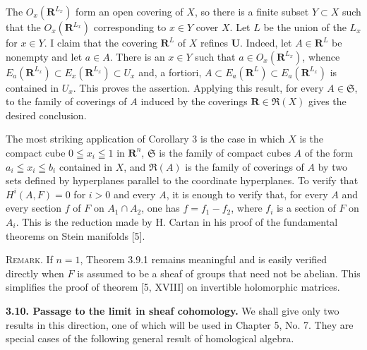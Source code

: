 
The $O_x(\mathbf R^{L_x})$ form an open covering of $X$, so there is a finite
subset $Y\subset X$ such that the $O_x(\mathbf R^{L_x})$ corresponding to
$x\in Y$ cover $X$. Let $L$ be the union of the $L_x$ for $x\in Y$. I claim
that the covering $\mathbf R^L$ of $X$ refines $\mathbf U$. Indeed, let
$A\in\mathbf R^L$ be nonempty and let $a\in A$. There is an $x\in Y$ such
that $a\in O_x(\mathbf R^{L_x})$, whence
$E_a(\mathbf R^{L_x})\subset E_x(\mathbf R^{L_x})\subset U_x$ and, a
fortiori,
$A\subset E_a(\mathbf R^L)\subset E_a(\mathbf R^{L_x})$ is contained in
$U_x$. This proves the assertion. Applying this result, for every
$A\in\mathfrak S$, to the family of coverings of $A$ induced by the coverings
$\mathbf R\in\mathfrak R(X)$ gives the desired conclusion.

The most striking application of Corollary 3 is the case in which $X$ is the
compact cube $0\leqq x_i\leqq1$ in $\mathbf R^n$, $\mathfrak S$ is the family
of compact cubes $A$ of the form $a_i\leqq x_i\leqq b_i$ contained in $X$,
and $\mathfrak R(A)$ is the family of coverings of $A$ by two sets defined by
hyperplanes parallel to the coordinate hyperplanes. To verify that
$H^i(A,F)=0$ for $i>0$ and every $A$, it is enough to verify that, for every
$A$ and every section $f$ of $F$ on $A_1\cap A_2$, one has $f=f_1-f_2$,
where $f_i$ is a section of $F$ on $A_i$. This is the reduction made by
H. Cartan in his proof of the fundamental theorems on Stein manifolds [5].

\textsc{Remark.} If $n=1$, Theorem 3.9.1 remains meaningful and is
easily verified directly when $F$ is assumed to be a sheaf of groups that
need not be abelian. This simplifies the proof of theorem [5, XVIII] on
invertible holomorphic matrices.

\textbf{3.10. Passage to the limit in sheaf cohomology.}
We shall give only two results in this direction, one of which will be used
in Chapter 5, No. 7. They are special cases of the following general result
of homological algebra.

